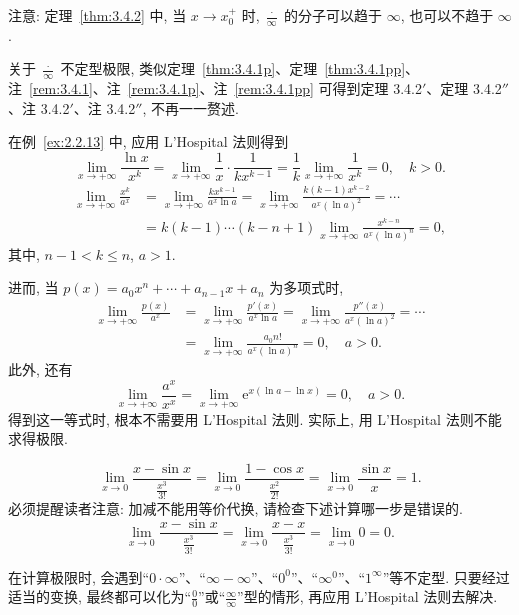 注意: 定理~\ref{thm:3.4.2} 中, 当 $x\to x_0^{+}$ 时, $\frac{\cdot}{\infty}$ 的分子可以趋于 $\infty$, 也可以不趋于 $\infty$.

关于 $\frac{\cdot}{\infty}$ 不定型极限, 类似定理~\ref{thm:3.4.1p}、定理~\ref{thm:3.4.1pp}、注~\ref{rem:3.4.1}、注~\ref{rem:3.4.1p}、注~\ref{rem:3.4.1pp} 可得到定理 3.4.2$'$、定理 3.4.2$''$、注 3.4.2$'$、注 3.4.2$''$, 不再一一赘述.

\begin{example}\label{ex:3.4.1}
在例~\ref{ex:2.2.13} 中, 应用 L'Hospital 法则得到
\[
\lim_{x\to+\infty}\frac{\ln x}{x^{k}}=\lim_{x\to+\infty}\frac{1}{x}\cdot\frac{1}{kx^{k-1}}=\frac{1}{k}\lim_{x\to+\infty}\frac{1}{x^{k}}=0,\quad k>0.
\]
\[
\begin{aligned}
\lim_{x\to+\infty}\frac{x^{k}}{a^{x}}&=\lim_{x\to+\infty}\frac{kx^{k-1}}{a^{x}\ln a}=\lim_{x\to+\infty}\frac{k(k-1)x^{k-2}}{a^{x}(\ln a)^{2}}=\cdots\\
&=k(k-1)\cdots(k-n+1)\lim_{x\to+\infty}\frac{x^{k-n}}{a^{x}(\ln a)^{n}}=0,
\end{aligned}
\]
其中, $n-1<k\leqslant n$, $a>1$.

进而, 当 $p(x)=a_0x^{n}+\cdots+a_{n-1}x+a_{n}$ 为多项式时,
\[
\begin{aligned}
\lim_{x\to+\infty}\frac{p(x)}{a^{x}}&=\lim_{x\to+\infty}\frac{p'(x)}{a^{x}\ln a}=\lim_{x\to+\infty}\frac{p''(x)}{a^{x}(\ln a)^{2}}=\cdots\\
&=\lim_{x\to+\infty}\frac{a_0n!}{a^{x}(\ln a)^{n}}=0,\quad a>0.
\end{aligned}
\]
此外, 还有
\[
\lim_{x\to+\infty}\frac{a^{x}}{x^{x}}=\lim_{x\to+\infty}\mathrm{e}^{x(\ln a-\ln x)}=0,\quad a>0.
\]
得到这一等式时, 根本不需要用 L'Hospital 法则. 实际上, 用 L'Hospital 法则不能求得极限.
\end{example}

\begin{example}\label{ex:3.4.2}
\[
\lim_{x\to0}\frac{x-\sin x}{\frac{x^{3}}{3!}}=\lim_{x\to0}\frac{1-\cos x}{\frac{x^{2}}{2!}}=\lim_{x\to0}\frac{\sin x}{x}=1.
\]
必须提醒读者注意: 加减不能用等价代换, 请检查下述计算哪一步是错误的.
\[
\lim_{x\to0}\frac{x-\sin x}{\frac{x^{3}}{3!}}=\lim_{x\to0}\frac{x-x}{\frac{x^{3}}{3!}}=\lim_{x\to0}0=0.
\]
\end{example}

在计算极限时, 会遇到“$0\cdot\infty$”、“$\infty-\infty$”、“$0^{0}$”、“$\infty^{0}$”、“$1^{\infty}$”等不定型. 只要经过适当的变换, 最终都可以化为“$\frac{0}{0}$”或“$\frac{\infty}{\infty}$”型的情形, 再应用 L'Hospital 法则去解决.

